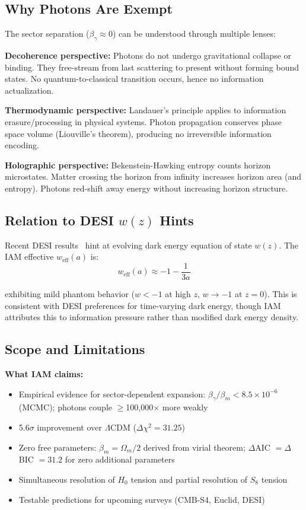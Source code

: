 \documentclass[twocolumn,superscriptaddress,prl,amsmath,amssymb]{revtex4-2}
\begin{document}
\subsection{Why Photons Are Exempt}

The sector separation ($\beta_\gamma \approx 0$) can be understood through multiple lenses:

\textbf{Decoherence perspective:} Photons do not undergo gravitational collapse or binding. They free-stream from last scattering to present without forming bound states. No quantum-to-classical transition occurs, hence no information actualization.

\textbf{Thermodynamic perspective:} Landauer's principle applies to information erasure/processing in physical systems. Photon propagation conserves phase space volume (Liouville's theorem), producing no irreversible information encoding.

\textbf{Holographic perspective:} Bekenstein-Hawking entropy counts horizon microstates. Matter crossing the horizon from infinity increases horizon area (and entropy). Photons red-shift away energy without increasing horizon structure.

\subsection{Relation to DESI $w(z)$ Hints}

Recent DESI results~\cite{DESI2024} hint at evolving dark energy equation of state $w(z)$. The IAM effective $w_{\text{eff}}(a)$ is:
\begin{equation}
w_{\text{eff}}(a) \approx -1 - \frac{1}{3a}
\end{equation}

exhibiting mild phantom behavior ($w < -1$ at high $z$, $w \to -1$ at $z=0$). This is consistent with DESI preferences for time-varying dark energy, though IAM attributes this to information pressure rather than modified dark energy density.

\subsection{Scope and Limitations}

\textbf{What IAM claims:}
\begin{itemize}
\item Empirical evidence for sector-dependent expansion: $\beta_\gamma/\beta_m < 8.5 \times 10^{-6}$ (MCMC); photons couple $\geq$100,000$\times$ more weakly
\item 5.6$\sigma$ improvement over $\Lambda$CDM ($\Delta\chi^2 = 31.25$)
\item Zero free parameters: $\beta_m = \Omega_m/2$ derived from virial theorem; $\Delta$AIC $= \Delta$BIC $= 31.2$ for zero additional parameters
\item Simultaneous resolution of $H_0$ tension and partial resolution of $S_8$ tension
\item Testable predictions for upcoming surveys (CMB-S4, Euclid, DESI)
\end{itemize}
\end{document}

